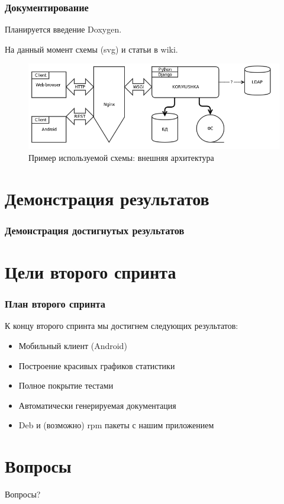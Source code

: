 \documentclass{beamer}
\newlength{\wideitemsep}
\let\olditem\item
\renewcommand{\item}{\setlength{\itemsep}{\wideitemsep}\olditem}
\begin{document}
\begin{frame}
\frametitle{Документирование}

Планируется введение Doxygen.

На данный момент схемы (svg) и статьи в wiki.

\begin{figure}
\includegraphics[scale=0.60]{res/r2_kormushka_ext}
\caption{Пример используемой схемы: внешняя архитектура}
\end{figure}


\end{frame}


\section{Демонстрация результатов}

\begin{frame}
\frametitle{Демонстрация достигнутых результатов}



\end{frame}

\section{Цели второго спринта}

\begin{frame}
\frametitle{План второго спринта}

К концу второго спринта мы достигнем следующих результатов:
\medskip
\begin{itemize}
\item Мобильный клиент (Android)
\item Построение красивых графиков статистики
\item Полное покрытие тестами
\item Автоматически генерируемая документация
\item Deb и (возможно) rpm пакеты с нашим приложением
\end{itemize}

\end{frame}

\section{Вопросы}

\begin{frame}
\Huge{\centerline{Вопросы?}}
\end{frame}

\end{document}
